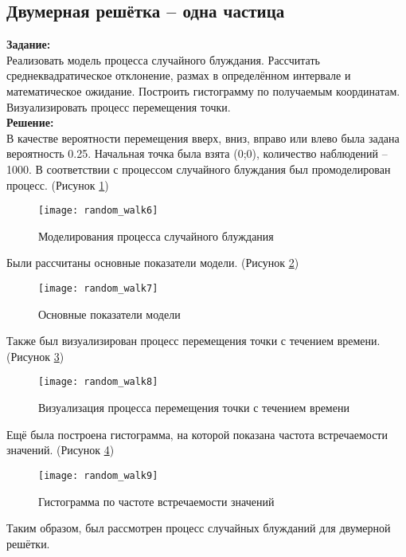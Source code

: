 \subsection*{Двумерная решётка -- одна частица}

\textbf{Задание:}\\
Реализовать модель процесса случайного блуждания. Рассчитать среднеквадратическое отклонение, размах в определённом интервале и математическое ожидание. Построить гистограмму по получаемым координатам. Визуализировать процесс перемещения точки.\\

\textbf{Решение:}\\
В качестве вероятности перемещения вверх, вниз, вправо или влево была задана вероятность 0.25. Начальная точка была взята (0;0), количество наблюдений -- 1000. В соответствии с процессом случайного блуждания был промоделирован процесс. (Рисунок \ref{fig:random_walk6})
\begin{figure}[h]
	\centering \texttt{[image: random\_walk6]}
	\caption{Моделирования процесса случайного блуждания}
	\label{fig:random_walk6}
\end{figure}

Были рассчитаны основные показатели модели. (Рисунок \ref{fig:random_walk7})
\begin{figure}[h]
	\centering \texttt{[image: random\_walk7]}
	\caption{Основные показатели модели}
	\label{fig:random_walk7}
\end{figure}

\newpage

Также был визуализирован процесс перемещения точки с течением времени. (Рисунок \ref{fig:random_walk8})
\begin{figure}[h]
	\centering \texttt{[image: random\_walk8]}
	\caption{Визуализация процесса перемещения точки с течением времени}
	\label{fig:random_walk8}
\end{figure}

Ещё была построена гистограмма, на которой показана частота встречаемости значений. (Рисунок \ref{fig:random_walk9})

\begin{figure}[h]
	\centering \texttt{[image: random\_walk9]}
	\caption{Гистограмма по частоте встречаемости значений}
	\label{fig:random_walk9}
\end{figure}

Таким образом, был рассмотрен процесс случайных блужданий для двумерной решётки.